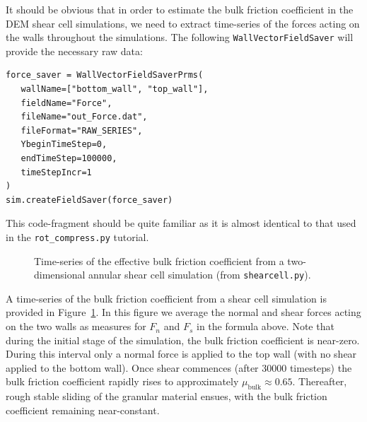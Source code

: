It should be obvious that in order to estimate the bulk friction coefficient in the DEM shear cell simulations, we need to extract time-series of the forces acting on the walls throughout the simulations. The following \texttt{WallVectorFieldSaver} will provide the necessary raw data:

\begin{verbatim}
force_saver = WallVectorFieldSaverPrms(
   wallName=["bottom_wall", "top_wall"],
   fieldName="Force",
   fileName="out_Force.dat",
   fileFormat="RAW_SERIES",
   YbeginTimeStep=0,
   endTimeStep=100000,
   timeStepIncr=1
)
sim.createFieldSaver(force_saver)
\end{verbatim}

\noindent
This code-fragment should be quite familiar as it is almost identical to that used in the \texttt{rot\_compress.py} tutorial. 

\begin{figure}
\begin{center}
\end{center}
\caption{Time-series of the effective bulk friction coefficient from a two-dimensional annular shear cell simulation (from \texttt{shearcell.py}).} \label{fig:bulkFriction}
\end{figure}

A time-series of the bulk friction coefficient from a shear cell simulation is provided in Figure~\ref{fig:bulkFriction}. In this figure we average the normal and shear forces acting on the two walls as measures for $F_n$ and $F_s$ in the formula above. Note that during the initial stage of the simulation, the bulk friction coefficient is near-zero. During this interval only a normal force is applied to the top wall (with no shear applied to the bottom wall). Once shear commences (after $30000$ timesteps) the bulk friction coefficient rapidly rises to approximately $\mu_{\mathrm{bulk}} \approx 0.65$. Thereafter, rough stable sliding of the granular material ensues, with the bulk friction coefficient remaining near-constant.

